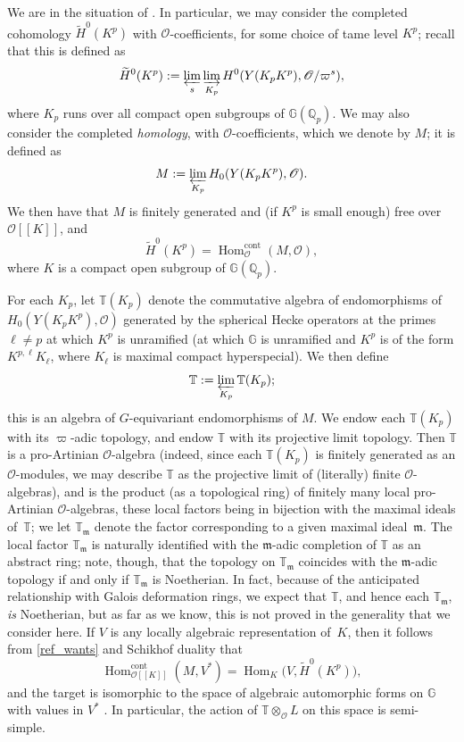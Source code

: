\documentclass[JEP,XML,SOM,Unicode,NoEqCountersInSection]{cedram}
\let\mathcal\mathscr
\theoremstyle{definition}
\DeclareMathOperator{\Hom}{Hom}
\newcommand{\br}[1]{[\![#1]\!]}
\newcommand{\Q}{\mathbb{Q}}
\newcommand{\Qp}{\mathbb {Q}_p}
\newcommand{\cO}{\mathcal{O}}
\newcommand{\cont}{\mathrm{cont}}
\begin{document}
We are in the situation of \cite[(3.2)]{em0}.
In particular, we may consider the completed cohomology
$\widetilde{H}^0(K^p)$ with $\mathcal O$-coefficients,
for some choice of tame level $K^p$;
recall that this is defined as
\[
\widetilde{H}^0(K^p) := \varprojlim_s \varinjlim_{K_p}
H^0( Y(K_pK^p) , \mathcal O/ \varpi^s),
\]
where $K_p$ runs over all compact open subgroups of $\mathbb G(\Q_p)$.
We may also consider the completed {\em homology}, with $\mathcal O$-coefficients,
which we denote by $M$;
it is defined as
\[
M := \varprojlim_{K_p}
H_0(Y(K_pK^p) ,\mathcal O).
\]
We then have
that $M$ is finitely generated and (if $K^p$ is small enough)
free over~$\mathcal O\br{K}$, and
\begin{equation}\label{ref_wants}
\widetilde{H}^0(K^p) = \Hom^{\cont}_{\mathcal O}(M,\cO),
\end{equation}
where $K$ is a compact open subgroup of $\mathbb G(\Qp)$.

For each $K_p$, let $\mathbb T(K_p)$ denote the commutative algebra
of endomorphisms of
$H_0
(Y(K_pK^p) ,
\mathcal O)$
generated by the spherical Hecke operators
at the primes $\ell \neq p$ at which $K^p$ is unramified (\ie at which
$\mathbb G$ is unramified and $K^p$ is of the form
$K^{p,\ell} K_{\ell}$, where $K_{\ell}$ is maximal compact hyperspecial).
We then define
\[
\mathbb T := \varprojlim_{K_p} \mathbb T(K_p);
\]
this is an algebra of $G$-equivariant endomorphisms of $M$.
We endow each $\mathbb T(K_p)$ with its $\varpi$-adic topology,
and endow $\mathbb T$ with its projective limit topology.
Then $\mathbb T$ is a pro-Artinian $\mathcal O$-algebra
(indeed, since each $\mathbb T(K_p)$ is finitely generated as an $\mathcal O$-modules,
we may describe $\mathbb T$ as
the projective limit of (literally) finite $\mathcal O$-algebras),
and is the product (as a topological ring) of finitely many local pro-Artinian
$\mathcal O$-algebras,
these local factors being in bijection with the maximal ideals of~$\mathbb T$;
we let $\mathbb T_{\mathfrak m}$ denote the factor corresponding to a given
maximal ideal~$\mathfrak m$.
The local factor $\mathbb T_{\mathfrak m}$ is naturally identified with
the $\mathfrak m$-adic completion of $\mathbb T$ as an abstract ring;
note, though, that the topology on $\mathbb T_{\mathfrak m}$ coincides with the
$\mathfrak m$-adic topology if and only if $\mathbb T_{\mathfrak m}$
is Noetherian. In fact, because of the anticipated relationship
with Galois deformation rings, we expect that $\mathbb T$,
and hence each $\mathbb T_{\mathfrak m}$, {\em is} Noetherian,
but as far as we know, this is not proved in the generality that we consider here.
If $V$ is any locally algebraic representation of~$K$,
then it follows from \eqref{ref_wants} and Schikhof duality \cite[Th.\,3.5]{iw} that
\[
\Hom_{\mathcal O\br{K}}^{\cont}(M,V^*) =
\Hom_{ K} \bigl(V, \widetilde{H}^0(K^p)\bigr),
\]
and the target is isomorphic to the space of algebraic automorphic forms
on $\mathbb G$ with values in $V^*$ \cite[Prop.\,3.2.4]{em0}.
In particular, the action of $\mathbb T \otimes_{\mathcal O}L$ on
this space is semi-simple.
\end{document}
